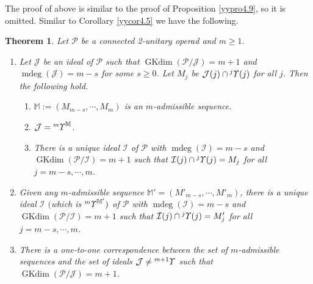 \documentclass{amsart}
\newtheorem{thm}{Theorem}[section]
\theoremstyle{definition}
\theoremstyle{remark}
\numberwithin{equation}{section}
\def\mdeg{\operatorname{mdeg}}
\newcommand{\up}[1]{{^{#1}{\it \!\Upsilon}}}
\def \I{\mathcal{I}}
\def \J{\mathcal{J}}
\def \ip{{\mathcal{P}}}
\def\gkdim{\operatorname{GKdim}}
\begin{document}
The proof of above is similar to the proof of 
Proposition \ref{yypro4.9}, so it is omitted.
Similar to Corollary \ref{yycor4.5} we have the
following.

\begin{thm}
\label{yythm4.16}
Let $\ip$ be a connected 2-unitary operad and $m\ge 1$. 
\begin{enumerate}
\item[(1)] 
Let $\J$ be an ideal of $\ip$ such that 
$\gkdim (\ip/\J) =m+1$ and $\mdeg(\J)=m-s$ for some 
$s\geq 0$. Let $M_{j}$ be $\J(j)\cap \up{j}(j)$ for 
all $j$. Then the following hold.
\begin{enumerate}
\item[(1a)]
${\mathbb M}:=(M_{m-s},\cdots, M_m)$ is an $m$-admissible 
sequence.
\item[(1b)]
$\J=\up{m}^{\mathbb M}$.
\item[(1c)]
There is a unique ideal $\I$ of $\ip$ with
$\mdeg(\I)=m-s$ and $\gkdim(\ip/\I)=m+1$ such that 
$\I(j)\cap \up{j}(j)=M_j$ for all $j=m-s,\cdots,m$.
\end{enumerate}
\item[(2)]
Given any $m$-admissible sequence ${\mathbb M}'
=(M'_{m-s},\cdots,M'_{m})$, 
there is a unique ideal $\I$ $($which is $\up{m}^{{\mathbb M}'})$ 
of $\ip$ with $\mdeg(\I)=m-s$ and $\gkdim(\ip/\I)=m+1$ 
such that $\I(j)\cap \up{j}(j)=M'_j$ for all $j=m-s,\cdots,m$.
\item[(3)]
There is a one-to-one correspondence between the set of 
$m$-admissible sequences and the set of ideals $\J\neq 
\up{m+1}$ such that $\gkdim (\ip/\J)=m+1$.
\end{enumerate}
\end{thm}
\end{document}
